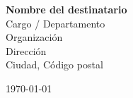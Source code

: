 \begin{minipage}[t]{0.62\linewidth}
\textbf{Nombre del destinatario}\\
Cargo / Departamento\\
Organización\\
Dirección\\
Ciudad, Código postal
\end{minipage}\hfill
\begin{minipage}[t]{0.32\linewidth}\raggedleft
{\small\color{muted}\today}
\end{minipage}
\vspace{22pt}

